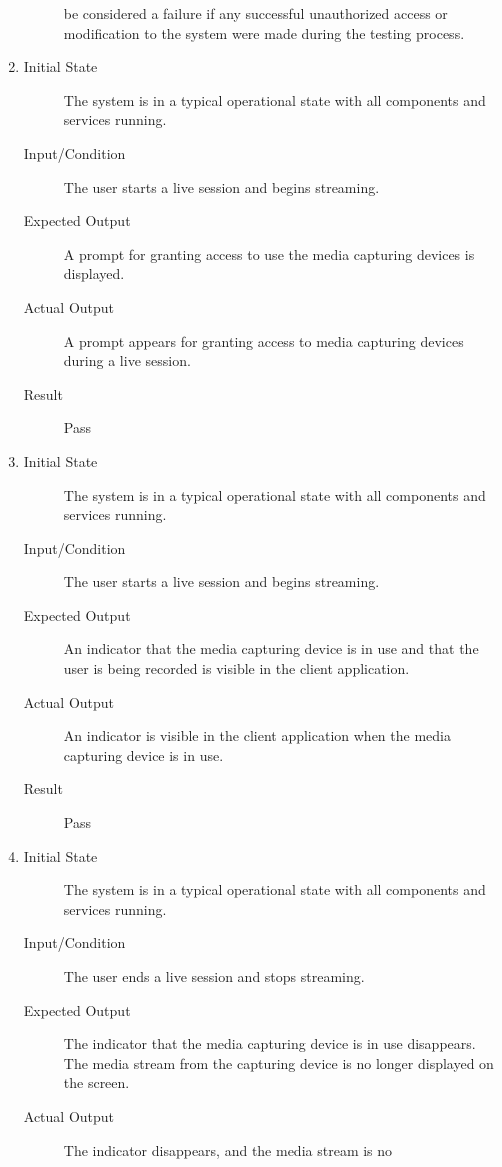 \documentclass[12pt, titlepage]{article}
\begin{document}
\begin{enumerate}[NFR-T1]
\begin{description}
      be considered a failure if any successful unauthorized access or
      modification to the system were made during the testing process.
    \end{description}
  \item \label{NFRT24}
    \begin{description}
    \item[Initial State] The system is in a typical operational state with all
      components and services running.
    \item[Input/Condition] The user starts a live session and begins streaming.
    \item[Expected Output] A prompt for granting access to use the media capturing
      devices is displayed.
    \item[Actual Output] A prompt appears for granting access to media capturing 
    devices during a live session.
    \item[Result] Pass 
    \end{description}
  \item \label{NFRT25}
    \begin{description}
    \item[Initial State] The system is in a typical operational state with all
      components and services running.
    \item[Input/Condition] The user starts a live session and begins streaming.
    \item[Expected Output] An indicator that the media capturing device is in use
      and that the user is being recorded is visible in the client application.
    \item[Actual Output] An indicator is visible in the client application when 
    the media capturing device is in use.
    \item[Result] Pass 
    \end{description}
  \item \label{NFRT26}
    \begin{description}
    \item[Initial State] The system is in a typical operational state with all
      components and services running.
    \item[Input/Condition] The user ends a live session and stops streaming.
    \item[Expected Output] The indicator that the media capturing device is in use
      disappears. The media stream from the capturing device is no longer
      displayed on the screen.
    \item[Actual Output] The indicator disappears, and the media stream is no 

\end{description}
\end{enumerate}
\end{document}
